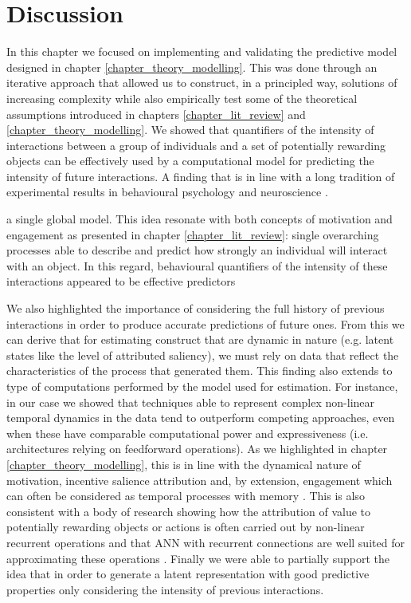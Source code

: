 \section{Discussion}
\label{discussion_3}
In this chapter we focused on implementing and validating the predictive model designed in chapter \ref{chapter_theory_modelling}. This was done through an iterative approach that allowed us to construct, in a principled way, solutions of increasing complexity while also empirically test some of the theoretical assumptions introduced in chapters \ref{chapter_lit_review} and \ref{chapter_theory_modelling}. We showed that quantifiers of the intensity of interactions between a group of individuals and a set of potentially rewarding objects can be effectively used by a computational model for predicting the intensity of future interactions. A finding that is in line with a long tradition of experimental results in behavioural psychology \cite{thorndike1927law, skinner1953science} and neuroscience \cite{schultz1997neural, berridge2004motivation}. 


a single global model. This idea resonate with both concepts of motivation and engagement as presented in chapter \ref{chapter_lit_review}: single overarching processes able to describe and predict how strongly an individual will interact with an object. In this regard, behavioural quantifiers of the intensity of these interactions appeared to be effective predictors 

We also highlighted the importance of considering the full history of previous interactions in order to produce accurate predictions of future ones. From this we can derive that for estimating construct that are dynamic in nature (e.g. latent states like the level of attributed saliency), we must rely on data that reflect the characteristics of the process that generated them. This finding also extends to type of computations performed by the model used for estimation. For instance, in our case we showed that techniques able to represent complex non-linear temporal dynamics in the data tend to outperform competing approaches, even when these have comparable computational power and expressiveness (i.e. architectures relying on feedforward operations). As we highlighted in chapter \ref{chapter_theory_modelling}, this is in line with the dynamical nature of motivation, incentive salience attribution and, by extension, engagement which can often be considered as temporal processes with memory \cite{toates1994comparing,robinson1993neural,zhang2009neural,tindell2009dynamic,berridge2012prediction}. This is also consistent with a body of research showing how the attribution of value to potentially rewarding objects or actions is often carried out by non-linear recurrent operations \cite{song2017reward,wang2018prefrontal} and that ANN with recurrent connections are well suited for approximating these operations \cite{kietzmann2018deep}. Finally we were able to partially support the idea that in order to generate a latent representation with good predictive properties only considering the intensity of previous interactions.


